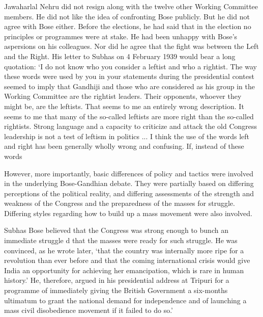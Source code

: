 \begin{multicols}{2}
Jawaharlal Nehru did not resign along with the twelve other Working Committee members. He did not like the idea of confronting Bose publicly. But he did not agree with Bose either. Before the elections, he had said that in the election no principles or programmes were at stake. He had been unhappy with Bose's aspersions on his colleagues. Nor did he agree that the fight was between the Left and the Right. His letter to Subhas on 4 February 1939 would bear a long quotation: `I do not know who you consider a leftist and who a rightist. The way these words were used by you in your statements during the presidential contest seemed to imply that Gandhiji and those who are considered as his group in the Working Committee are the rightist leaders. Their opponents, whoever they might be, are the leftists. That seems to me an entirely wrong description. It seems to me that many of the so-called leftists are more right than the so-called rightists. Strong language and a capacity to criticize and attack the old Congress leadership is not a test of leftism in politics ... I think the use of the words left and right has been generally wholly wrong and confusing. If, instead of these words%

However, more importantly, basic differences of policy and tactics were involved in the underlying Bose-Gandhian debate. They were partially based on differing perceptions of the political reality, and differing assessments of the strength and weakness of the Congress and the preparedness of the masses for struggle. Differing styles regarding how to build up a mass movement were also involved. 

Subhas Bose believed that the Congress was strong enough to bunch an immediate struggle d that the masses were ready for such struggle. He was convinced, as he wrote later, `that the country was internally more ripe for a revolution than ever before and that the coming international crisis would give India an opportunity for achieving her emancipation, which is rare in human history.' He, therefore, argued in his presidential address at Tripuri for a programme of immediately giving the British Government a six-months ultimatum to grant the national demand for independence and of launching a mass civil disobedience movement if it failed to do so.' 


\end{multicols}
